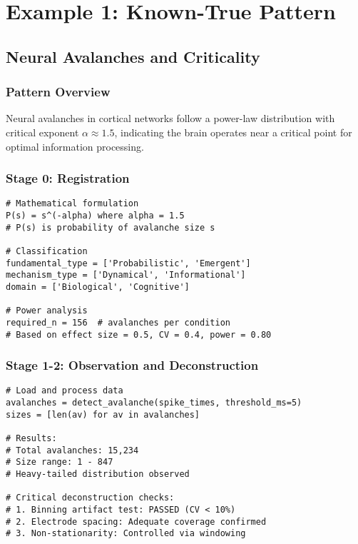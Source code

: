 \documentclass[12pt,oneside]{memoir}
\theoremstyle{plain}
\theoremstyle{definition}
\theoremstyle{remark}
\begin{document}
\chapter{Example 1: Known-True Pattern}
\section{Neural Avalanches and Criticality}

\subsection{Pattern Overview}
Neural avalanches in cortical networks follow a power-law distribution with critical exponent $\alpha \approx 1.5$, indicating the brain operates near a critical point for optimal information processing.

\subsection{Stage 0: Registration}

\begin{lstlisting}[caption={Pattern Definition}]
# Mathematical formulation
P(s) = s^(-alpha) where alpha = 1.5
# P(s) is probability of avalanche size s

# Classification
fundamental_type = ['Probabilistic', 'Emergent']
mechanism_type = ['Dynamical', 'Informational']
domain = ['Biological', 'Cognitive']

# Power analysis
required_n = 156  # avalanches per condition
# Based on effect size = 0.5, CV = 0.4, power = 0.80
\end{lstlisting}

\subsection{Stage 1-2: Observation and Deconstruction}

\begin{lstlisting}[caption={Initial Analysis}]
# Load and process data
avalanches = detect_avalanche(spike_times, threshold_ms=5)
sizes = [len(av) for av in avalanches]

# Results:
# Total avalanches: 15,234
# Size range: 1 - 847
# Heavy-tailed distribution observed

# Critical deconstruction checks:
# 1. Binning artifact test: PASSED (CV < 10%)
# 2. Electrode spacing: Adequate coverage confirmed
# 3. Non-stationarity: Controlled via windowing
\end{lstlisting}
\end{document}
